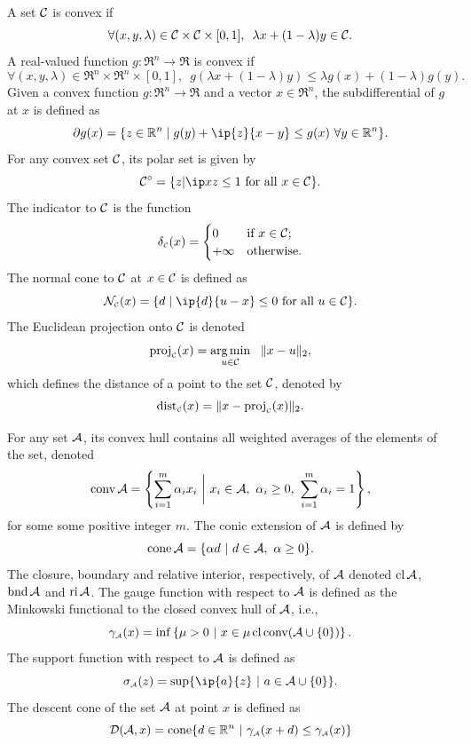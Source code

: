 A set $\mathcal{C}$ is convex if
\[
    \forall (x, y, \lambda) \in \mathcal{C}\times\mathcal{C}\times[0,1], 
    \enspace \lambda x + (1-\lambda)y \in \mathcal{C}. 
\]
A real-valued function $g:\Re^n\to\Re$ is convex if
\[
    \forall (x, y, \lambda) \in \Re^n\times\Re^n\times[0,1], 
    \enspace g\left(\lambda x + (1-\lambda)y\right) \leq \lambda g(x) + (1-\lambda)g(y). 
\]
Given a convex function $g:\Re^n\to\Re$ and a vector $x\in\Re^n$, the subdifferential of $g$ at $x$ is defined as 
\[\partial g(x) = \{z\in\Re^n \mid g(y) + \ip{z}{x - y} \leq g(x) ~\forall y \in \Re^n\}.\]
For any convex set $\mathcal{C}$, its polar set is given by 
\begin{equation} \label{eq-polar-set}
    \Cscr\polar=\{z | \ip x z \le 1 \mbox{\ for all\ } x\in\Cscr \}.
\end{equation}
The indicator to $\mathcal{C}$ is the
function
\[
  \delta_{\scriptscriptstyle\mathcal{C}}(x) = \begin{cases}
    0 & \mbox{if $x\in\mathcal{C}$;}
\\ +\infty & \mbox{otherwise}.
  \end{cases}
\]
The normal cone to $\mathcal{C}$ at $x\in\mathcal{C}$ is defined as
\[\Nscr\Cs(x) = \{d \mid \ip{d}{u - x} \leq 0 \mbox{ for all } u \in \Cscr\}.\]
The Euclidean projection onto $\mathcal{C}$ is denoted
\[\operatorname{proj}_{\scriptscriptstyle\mathcal{C}}(x) = \underset{u \in \mathcal{C}}{\textrm{arg}\,{\min}}\enskip \ \|x - u\|_2,\]
which defines the distance of a point to the set $\mathcal{C}$, denoted by
\[\operatorname{dist}_{\scriptscriptstyle\mathcal{C}}(x) = \|x - \operatorname{proj}_{\scriptscriptstyle\mathcal{C}}(x)\|_2.\]

For any set $\mathcal{A}$, its convex hull contains all
weighted averages of the elements of the set, denoted
\[
  \conv \Ascr =
  \left\{\sum_{i=1}^m \alpha_i x_i ~\bigg\vert~ x_i\in\Ascr,\ \alpha_i\ge0,\ \sum_{i=1}^m\alpha_i=1 \right\},
\]
for some some positive integer $m$. The conic extension of $\mathcal{A}$ is defined by 
\[
  \operatorname{cone}\mathcal{A} = \{\alpha d ~|~ d\in\mathcal{A},\ \alpha\ge0\}.
\]
The closure, boundary and relative interior, respectively,
of $\mathcal{A}$ denoted $\operatorname{cl}\mathcal{A}$, $\operatorname{bnd}\mathcal{A}$ and $\operatorname{ri}\mathcal{A}$. 
The gauge function with respect to $\mathcal{A}$ is defined as the Minkowski functional to the closed convex hull of $\mathcal{A}$, i.e.,
\begin{equation} \label{eq:gauge1}
    \gamma_{\scriptscriptstyle\mathcal{A}}(x) = \inf\left\{\mu > 0 ~|~ x \in \mu\operatorname{cl}\operatorname{conv}(\mathcal{A}\cup\{0\})\right\}.
\end{equation}
The support function with respect to $\mathcal{A}$ is defined as 
\begin{equation} \label{eq:support}
    \sigma\As(z) = \sup\{\ip{a}{z} ~|~ a\in\Ascr\cup\{0\}\}.
\end{equation}
The descent cone of the set $\mathcal{A}$ at point $x$ is defined as 
\[\mathcal{D}(\mathcal{A}, x) = \operatorname{cone}\{d\in \mathbb{R}^n ~|~ \gamma_{\scriptscriptstyle\mathcal{A}}(x + d) \leq \gamma_{\scriptscriptstyle\mathcal{A}}(x)\}\]

